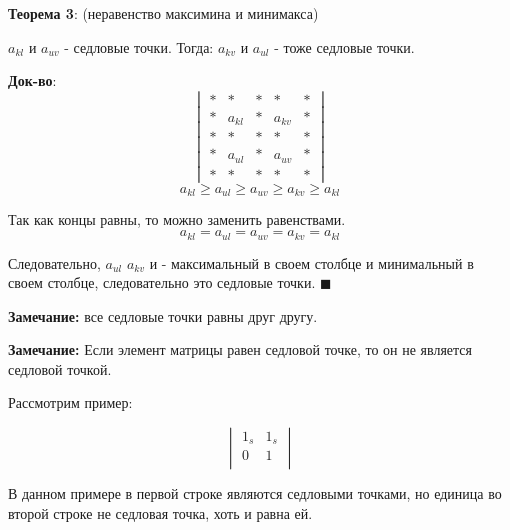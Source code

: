 \documentclass[aps,%
12pt,%
final,%
oneside,
onecolumn,%
musixtex, %
superscriptaddress,%
centertags]{article} %
\begin{document}
\textbf{Теорема 3}: (неравенство максимина и минимакса)

$a_{kl}$ и $a_{uv}$ - седловые точки. 
Тогда: $a_{kv}$ и $a_{ul}$ - тоже седловые точки. 

\textbf{Док-во}:
$$\begin{vmatrix}
	
 *  & * &  * &  *  & * \\ 
 * &a_{kl} & *  & a_{kv}  & * \\ 
 *  & *  & * &  * &  * \\ 
 * & a_{ul}  &  * & a_{uv} &* \\ 
 * & *  &  *  &   *    &  * 

\end{vmatrix}$$
$$ a_{kl} \geq a_{ul} \geq a_{uv} \geq a_{kv} \geq a_{kl} $$

Так как концы равны, то можно заменить равенствами. 
$$ a_{kl} =a_{ul} = a_{uv} = a_{kv} = a_{kl} $$

Следовательно, $a_{ul}$ $a_{kv}$ и - максимальный в своем столбце и минимальный в своем столбце, следовательно это седловые точки. $\blacksquare$

\textbf{Замечание:} все седловые точки равны друг другу.

\textbf{Замечание:} Если элемент матрицы равен седловой точке, то он не является седловой точкой.

Рассмотрим пример:

$$
\begin{vmatrix}
1_{s} & 1_{s} \\
0 & 1 \\
\end{vmatrix}
$$

В данном примере в первой строке являются седловыми точками, но единица во второй строке не седловая точка, хоть и равна ей.
\end{document}
